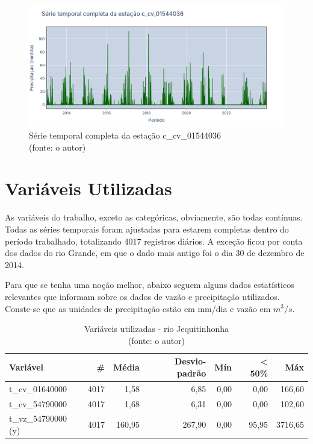 \begin{figure}[!h]
	\centering
	\includegraphics[scale=0.25]{Figuras/rio_sao_francisco/franciscoSerieCompleta_c_cv_01544036.png}
	\caption{Série temporal completa da estação c\_cv\_01544036\\(fonte: o autor)}
	\label{fig:franciscoSerieCompleta_c_cv_01544036}
\end{figure}
\clearpage

\section{Variáveis Utilizadas}

As variáveis do trabalho, exceto as categóricas, obviamente, são todas contínuas. Todas as séries temporais foram ajustadas para estarem completas dentro do período trabalhado, totalizando 4017 registros diários. A exceção ficou por conta dos dados do rio Grande, em que o dado mais antigo foi o dia 30 de dezembro de 2014.

Para que se tenha uma noção melhor, abaixo seguem alguns dados estatísticos relevantes que informam sobre os dados de vazão e precipitação utilizados. Conste-se que as unidades de precipitação estão em mm/dia e vazão em $m^3/s$.

\begin{table}[!h]
	\centering \small
	\caption{Variáveis utilizadas - rio Jequitinhonha \\(fonte: o autor)}
	\begin{tabular}{|l|r|r|r|r|r|r|} \hline 
		\textbf{Variável}   & \textbf{\#} & \textbf{Média} & \textbf{Desvio-padrão} & \textbf{Mín} & \textbf{< 50\%} & \textbf{Máx} \\\hline
		t\_cv\_01640000     & 4017        & 1,58           & 6,85                   & 0,00         & 0,00            & 166,60       \\\hline
		t\_cv\_54790000     & 4017        & 1,68           & 6,31                   & 0,00         & 0,00            & 102,60       \\\hline
		t\_vz\_54790000 (y) & 4017        & 160,95         & 267,90                 & 0,00         & 95,95           & 3716,65      \\\hline
	\end{tabular}
	\label{tab:variaveis_jequitinhonha}
\end{table}

